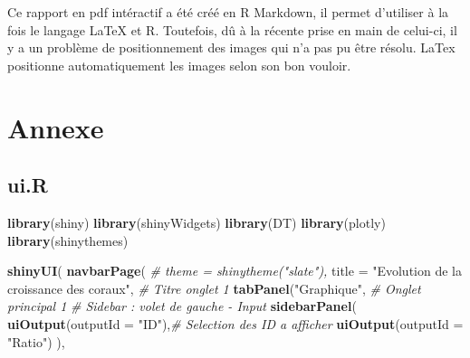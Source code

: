 \documentclass[]{report}
\newenvironment{Shaded}{\begin{snugshade}}{\end{snugshade}}
\newcommand{\KeywordTok}[1]{\textcolor[rgb]{0.13,0.29,0.53}{\textbf{#1}}}
\newcommand{\DataTypeTok}[1]{\textcolor[rgb]{0.13,0.29,0.53}{#1}}
\newcommand{\StringTok}[1]{\textcolor[rgb]{0.31,0.60,0.02}{#1}}
\newcommand{\CommentTok}[1]{\textcolor[rgb]{0.56,0.35,0.01}{\textit{#1}}}
\newcommand{\NormalTok}[1]{#1}
\begin{document}
Ce rapport en pdf intéractif a été créé en R Markdown, il permet
d'utiliser à la fois le langage LaTeX et R. Toutefois, dû à la récente
prise en main de celui-ci, il y a un problème de positionnement des
images qui n'a pas pu être résolu. LaTex positionne automatiquement les
images selon son bon vouloir.

\chapter{Annexe}\label{annexe}

\section{ui.R}\label{ui.r}

\begin{Shaded}
\begin{Highlighting}[]
\KeywordTok{library}\NormalTok{(shiny)}
\KeywordTok{library}\NormalTok{(shinyWidgets)}
\KeywordTok{library}\NormalTok{(DT)}
\KeywordTok{library}\NormalTok{(plotly)}
\KeywordTok{library}\NormalTok{(shinythemes)}

\KeywordTok{shinyUI}\NormalTok{(}
  \KeywordTok{navbarPage}\NormalTok{(}
    \CommentTok{# theme = shinytheme("slate"),}
    \DataTypeTok{title =} \StringTok{"Evolution de la croissance des coraux"}\NormalTok{, }\CommentTok{# Titre onglet 1}
    \KeywordTok{tabPanel}\NormalTok{(}\StringTok{"Graphique"}\NormalTok{, }\CommentTok{# Onglet principal 1}
             \CommentTok{# Sidebar : volet de gauche - Input}
             \KeywordTok{sidebarPanel}\NormalTok{(}
               \KeywordTok{uiOutput}\NormalTok{(}\DataTypeTok{outputId =} \StringTok{"ID"}\NormalTok{),}\CommentTok{# Selection des ID a afficher}
               \KeywordTok{uiOutput}\NormalTok{(}\DataTypeTok{outputId =} \StringTok{"Ratio"}\NormalTok{)}
\NormalTok{             ),}


\end{Highlighting}
\end{Shaded}
\end{document}
